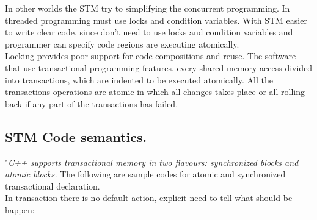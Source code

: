 \documentclass[12pt]{article}
\begin{document}
In other worlds the STM try to simplifying the concurrent programming. In threaded programming must use locks and condition variables. With STM easier to write clear code, since don't need to use locks and condition variables and programmer can specify code regions are executing atomically.\\

Locking provides poor support for code compositions and reuse. The software that use transactional programming features, every shared memory access divided into transactions, which are indented to be executed atomically. All the transactions operations are atomic in which all changes takes place or all rolling back if any part of the transactions has failed.\citep{STM}

\subsection{STM Code semantics.}
"\textit{C++ supports transactional memory in two flavours: synchronized blocks and atomic blocks.}\cite{Grimm}
The following are sample codes for atomic and synchronized transactional declaration.\\
In transaction there is no default action, explicit need to tell what should be happen:
\end{document}
